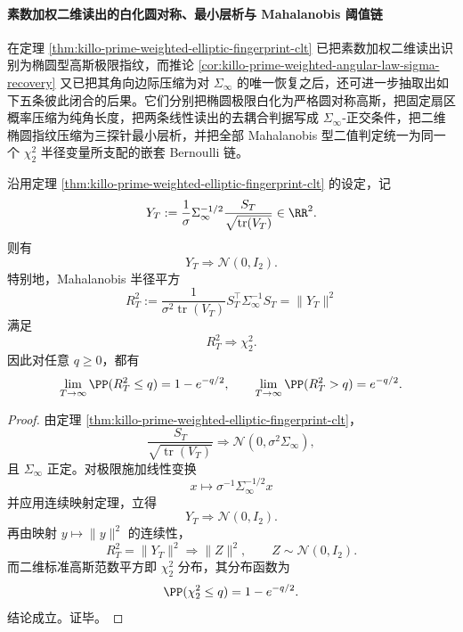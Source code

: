 \paragraph{素数加权二维读出的白化圆对称、最小层析与 Mahalanobis 阈值链}
在定理 \ref{thm:killo-prime-weighted-elliptic-fingerprint-clt} 已把素数加权二维读出识别为椭圆型高斯极限指纹，而推论 \ref{cor:killo-prime-weighted-angular-law-sigma-recovery} 又已把其角向边际压缩为对 \(\Sigma_\infty\) 的唯一恢复之后，还可进一步抽取出如下五条彼此闭合的后果。它们分别把椭圆极限白化为严格圆对称高斯，把固定扇区概率压缩为纯角长度，把两条线性读出的去耦合判据写成 \(\Sigma_\infty\)-正交条件，把二维椭圆指纹压缩为三探针最小层析，并把全部 Mahalanobis 型二值判定统一为同一个 \(\chi_2^2\) 半径变量所支配的嵌套 Bernoulli 链。

\begin{theorem}\label{thm:xi-time-part61aca-primeweighted-whitened-radial-chi2}
沿用定理 \ref{thm:killo-prime-weighted-elliptic-fingerprint-clt} 的设定，记
\[
Y_T:=\frac{1}{\sigma}\Sigma_\infty^{-1/2}
\frac{S_T}{\sqrt{\operatorname{tr}(V_T)}}\in\RR^2.
\]
则有
\[
Y_T\Longrightarrow \mathcal N(0,I_2).
\]
特别地，Mahalanobis 半径平方
\[
R_T^2
:=
\frac{1}{\sigma^2\operatorname{tr}(V_T)}
S_T^\top \Sigma_\infty^{-1}S_T
=
\|Y_T\|^2
\]
满足
\[
R_T^2\Longrightarrow \chi_2^2.
\]
因此对任意 \(q\ge 0\)，都有
\[
\lim_{T\to\infty}\PP(R_T^2\le q)=1-e^{-q/2},
\qquad
\lim_{T\to\infty}\PP(R_T^2>q)=e^{-q/2}.
\]
\end{theorem}
\begin{proof}
由定理 \ref{thm:killo-prime-weighted-elliptic-fingerprint-clt}，
\[
\frac{S_T}{\sqrt{\operatorname{tr}(V_T)}}
\Longrightarrow
\mathcal N(0,\sigma^2\Sigma_\infty),
\]
且 \(\Sigma_\infty\) 正定。对极限施加线性变换
\[
x\longmapsto \sigma^{-1}\Sigma_\infty^{-1/2}x
\]
并应用连续映射定理，立得
\[
Y_T\Longrightarrow \mathcal N(0,I_2).
\]
再由映射 \(y\mapsto \|y\|^2\) 的连续性，
\[
R_T^2=\|Y_T\|^2\Longrightarrow \|Z\|^2,
\qquad
Z\sim \mathcal N(0,I_2).
\]
而二维标准高斯范数平方即 \(\chi_2^2\) 分布，其分布函数为
\[
\PP(\chi_2^2\le q)=1-e^{-q/2}.
\]
结论成立。证毕。
\end{proof}

